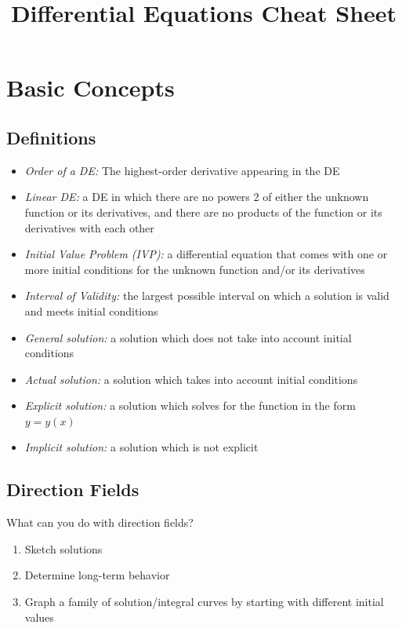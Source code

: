 \documentclass[12pt]{article}
\title{Differential Equations Cheat Sheet}
\date{}
\author{}
\theoremstyle{definition}
\begin{document}
\maketitle

\section{Basic Concepts}
\subsection{Definitions}
\begin{itemize}
	\item \textit{Order of a DE:} The highest-order derivative appearing in the DE
	\item \textit{Linear DE:} a DE in which there are no powers 2 of either the unknown function or its derivatives, and there are no products of the function or its derivatives with each other
	\item \textit{Initial Value Problem (IVP):} a differential equation that comes with one or more initial conditions for the unknown function and/or its derivatives
	\item \textit{Interval of Validity:} the largest possible interval on which a solution is valid and meets initial conditions
	\item \textit{General solution:} a solution which does not take into account initial conditions
	\item \textit{Actual solution:} a solution which takes into account initial conditions
	\item \textit{Explicit solution:} a solution which solves for the function in the form $y=y(x)$
	\item \textit{Implicit solution:} a solution which is not explicit
\end{itemize}

\subsection{Direction Fields}
What can you do with direction fields?
\begin{enumerate}
	\item Sketch solutions
	\item Determine long-term behavior
	\item Graph a family of solution/integral curves by starting with different initial values
\end{enumerate}
\end{document}
